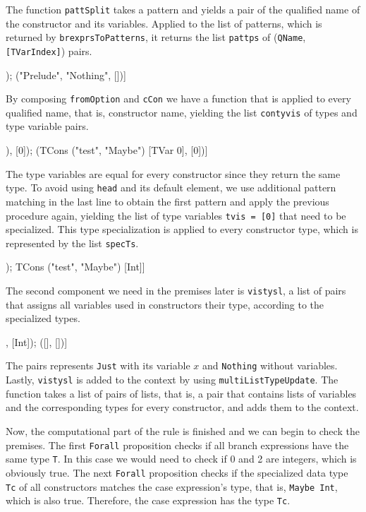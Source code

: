\documentclass[paper = a4, fleqn, abstract=on, twoside]{scrreprt}
\newcommand{\coqinline}[1]{\texttt{#1}}
\begin{document}
The function \coqinline{pattSplit} takes a pattern and yields a pair of the qualified name of the constructor and its variables. Applied to the list of patterns, which is returned by \coqinline{brexprsToPatterns}, it returns the list \texttt{pattps} of (\coqinline{QName}, \coqinline{[TVarIndex]}) pairs.
\begin{coqcode}
[("Prelude", "Just", [3]); ("Prelude", "Nothing", [])]
\end{coqcode}
By composing \coqinline{fromOption} and \coqinline{cCon} we have a function that is applied to every qualified name, that is, constructor name, yielding the list \texttt{contyvis} of types and type variable pairs.
\begin{coqcode}
[(FuncType (TVar 0) (TCons ("test", "Maybe") [TVar 0]), [0]);
                    (TCons ("test", "Maybe") [TVar 0],  [0])]
\end{coqcode}
The type variables are equal for every constructor since they return the same type. To avoid using \texttt{head} and its default element, we use additional pattern matching in the last line to obtain the first pattern and apply the previous procedure again, yielding the list of type variables \texttt{tvis = [0]} that need to be specialized. This type specialization is applied to every constructor type, which is represented by the list \texttt{specTs}.
\begin{coqcode}
[FuncType Int (TCons ("test", "Maybe") [Int]);
               TCons ("test", "Maybe") [Int]]
\end{coqcode}
The second component we need in the premises later is \texttt{vistysl}, a list of pairs that assigns all variables used in constructors their type, according to the specialized types.
\begin{coqcode}
[([3], [Int]); ([], [])]
\end{coqcode}
The pairs represents \texttt{Just} with its variable $x$ and \texttt{Nothing} without variables.
Lastly, \texttt{vistysl} is added to the context by using \coqinline{multiListTypeUpdate}. The function takes a list of pairs of lists, that is, a pair that contains lists of variables and the corresponding types for every constructor, and adds them to the context.
\par
Now, the computational part of the rule is finished and we can begin to check the premises. The first \texttt{Forall} proposition checks if all branch expressions have the same type \texttt{T}. In this case we would need to check if 0 and 2 are integers, which is obviously true. The next \texttt{Forall} proposition checks if the specialized data type \texttt{Tc} of all constructors matches the case expression's type, that is, \texttt{Maybe Int}, which is also true. Therefore, the case expression has the type \texttt{Tc}.
\end{document}
